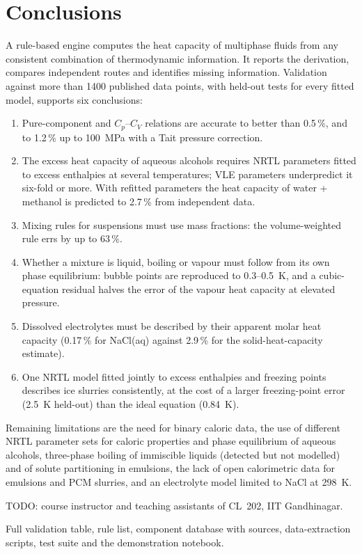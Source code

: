 \documentclass[journal=jceaax,manuscript=article,layout=twocolumn]{achemso}
\begin{document}
\section{Conclusions}
A rule-based engine computes the heat capacity of multiphase fluids from any consistent combination of
thermodynamic information. It reports the derivation, compares independent routes and identifies
missing information. Validation against more than 1400 published data points, with held-out tests for every
fitted model, supports six conclusions:
\begin{enumerate}
\item Pure-component and $C_p$--$C_V$ relations are accurate to better than 0.5\,\%, and to 1.2\,\% up to
100~MPa with a Tait pressure correction.
\item The excess heat capacity of aqueous alcohols requires NRTL parameters fitted to excess enthalpies at
several temperatures; VLE parameters underpredict it six-fold or more. With refitted parameters the
heat capacity of water + methanol is predicted to 2.7\,\% from independent data.
\item Mixing rules for suspensions must use mass fractions: the volume-weighted rule errs by up to 63\,\%.
\item Whether a mixture is liquid, boiling or vapour must follow from its own phase equilibrium: bubble points
are reproduced to 0.3--0.5~K, and a cubic-equation residual halves the error of the vapour heat capacity at
elevated pressure.
\item Dissolved electrolytes must be described by their apparent molar heat capacity (0.17\,\% for NaCl(aq)
against 2.9\,\% for the solid-heat-capacity estimate).
\item One NRTL model fitted jointly to excess enthalpies and freezing points describes ice slurries
consistently, at the cost of a larger freezing-point error (2.5~K held-out) than the ideal equation (0.84~K).
\end{enumerate}
Remaining limitations are the need for binary caloric data, the use of different NRTL parameter sets for
caloric properties and phase equilibrium of aqueous alcohols, three-phase boiling of immiscible liquids
(detected but not modelled) and of solute partitioning in emulsions, the lack of open calorimetric data for emulsions and
PCM slurries, and an electrolyte model limited to NaCl at 298~K.

\begin{acknowledgement}
TODO: course instructor and teaching assistants of CL~202, IIT Gandhinagar.
\end{acknowledgement}

\begin{suppinfo}
Full validation table, rule list, component database with sources, data-extraction scripts, test suite and the demonstration notebook.
\end{suppinfo}


\end{document}
